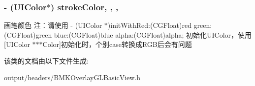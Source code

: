 \subsubsection[{stroke\+Color}]{\setlength{\rightskip}{0pt plus 5cm}-\/ (U\+I\+Color$\ast$) stroke\+Color\hspace{0.3cm}{\ttfamily [read]}, {\ttfamily [write]}, {\ttfamily [nonatomic]}, {\ttfamily [strong]}}\label{interface_b_m_k_overlay_g_l_basic_view_a99dfabd79cc8a845a742f5ee5742c626}
画笔颜色 注：请使用 -\/ (U\+I\+Color $\ast$)init\+With\+Red\+:(\+C\+G\+Float)red green\+:(\+C\+G\+Float)green blue\+:(\+C\+G\+Float)blue alpha\+:(\+C\+G\+Float)alpha; 初始化\+U\+I\+Color，使用\mbox{[}U\+I\+Color $\ast$$\ast$$\ast$\+Color\mbox{]}初始化时，个别case转换成\+R\+G\+B后会有问题 

该类的文档由以下文件生成\+:\begin{DoxyCompactItemize}
\item 
output/headers/B\+M\+K\+Overlay\+G\+L\+Basic\+View.\+h\end{DoxyCompactItemize}
